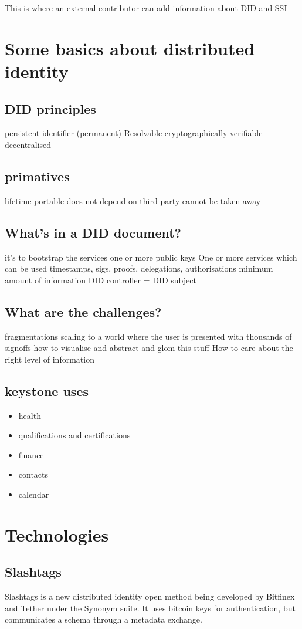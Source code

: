This is where an external contributor can add information about DID and SSI
\section{Some basics about distributed identity}
\subsection{DID principles}
persistent identifier (permanent)
Resolvable
cryptographically verifiable
decentralised
\subsection{primatives}
lifetime
portable
does not depend on third party
cannot be taken away
\subsection{What's in a DID document?}
it's to bootstrap the services
one or more public keys
One or more services which can be used
timestamps, sigs, proofs, delegations, authorisations
minimum amount of information
DID controller = DID subject
\subsection{What are the challenges?}
    fragmentations
    scaling to a world where the user is presented with thousands of signoffs
    how to visualise and abstract and glom this stuff
    How to care about the right level of information
\subsection{keystone uses}
\begin{itemize}
\item health
\item qualifications and certifications
\item finance
\item contacts
\item calendar
\end{itemize}  
\section{Technologies}
\subsection{Slashtags}
Slashtags is a new distributed identity open method being developed by Bitfinex and Tether under the Synonym suite. It uses bitcoin keys for authentication, but communicates a schema through a metadata exchange.
